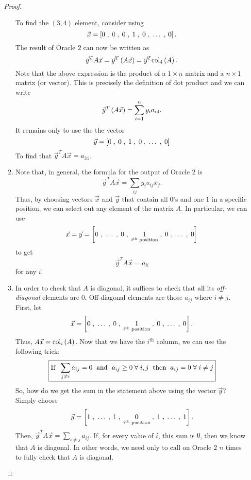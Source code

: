 \documentclass{tutorial}
\begin{document}
\begin{proof}
\begin{enumerate}[label=(\alph*)]
To find the $(3,4)$ element, consider using
\[
	\vec{x} = \ls 0 \; , \; 0 \; , \; 0 \; , \; 1 \; , \; 0 \; , \; \dots \; , \; 0 \rs .
\]
The result of Oracle $2$ can now be written as
\[
	\vec{y}^T A \vec{x} = \vec{y}^T \lp A \vec{x} \rp = \vec{y}^T \col{A}{4} .
\]
Note that the above expression is the product of a $1 \times n$ matrix and a $n \times 1$ matrix (or vector). This is precisely the definition of dot product and we can write
\[
	\vec{y}^T \lp A \vec{x} \rp = \sum_{i=1}^n y_i a_{i4} .
\]
It remains only to use the the vector
\[
	\vec{y} = \ls 0 \; , \; 0 \; , \; 1 \; , \; 0 \; , \; \dots \; , \; 0 \rs
\]
To find that $\vec{y}^TA\vec{x} = a_{34}$.
\item Note that, in general, the formula for the output of Oracle $2$ is
\[
	\vec{y}^T A \vec{x} = \sum_{ij} y_i a_{ij} x_j .
\]
Thus, by choosing vectors $\vec{x}$ and $\vec{y}$ that contain all $0$'s and one $1$ in a specific position, we can select out any element of the matrix $A$. In particular, we can use
\[
	\vec{x} = \vec{y} = \ls 0 \; , \; \dots \; , \; 0 \; , \; \underset{i^{\text{th}}\; \text{position}}{1} \; , \; 0 \; , \; \dots \; , \; 0 \rs
\]
to get 
\[
	\vec{y}^T A \vec{x} = a_{ii}
\]
for any $i$.
\item In order to check that $A$ is diagonal, it suffices to check that all its \emph{off-diagonal} elements are $0$. Off-diagonal elements are those $a_{ij}$ where $i \neq j$. First, let
\[
	\vec{x} = \ls 0 \; , \; \dots \; , \; 0 \; , \; \underset{i^{\text{th}}\; \text{position}}{1} \;, \; 0 \; , \; \dots \; , \; 0 \rs .
\]
Thus, $A\vec{x} = \col{A}{i}$. Now that we have the $i^{\text{th}}$ column, we can use the following trick:
\[
	\boxed{\text{If \;} \sum_{j \neq i} a_{ij} = 0
	\text{\; and \;} a_{ij} \geq 0 \; \forall \; i,j
	\text{\; then \;} a_{ij} = 0 \; \forall \; i \neq j}
\]
So, how do we get the sum in the statement above using the vector $\vec{y}$? Simply choose
\[
	\vec{y} = \ls 1 \; , \; \dots \; , \; 1 \; , \; \underset{i^{\text{th}}\; \text{position}}{0} \;, \; 1 \; , \; \dots \; , \; 1 \rs .
\]
Then, $\vec{y}^TA\vec{x} = \sum_{i \neq j} a_{ij}$. If, for every value of $i$, this sum is $0$, then we know that $A$ is diagonal. In other words, we need only to call on Oracle $2$ $n$ times to fully check that $A$ is diagonal.
\end{enumerate}
\end{proof} \fi
\end{document}
